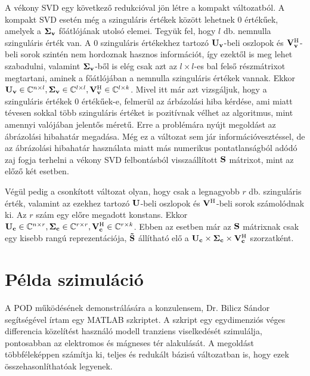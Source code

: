            A vékony SVD egy következő redukcióval jön létre a kompakt változatból. A kompakt SVD esetén még a szinguláris értékek között lehetnek 0 értékűek, amelyek a ${\bf \Sigma_v}$ főátlójának utolsó elemei. Tegyük fel, hogy $l$ db. nemnulla szinguláris érték van. A 0 szinguláris értékekhez tartozó ${\bf U_v}$-beli oszlopok és ${\bf V_v^{\mathrm{H}}}$-beli sorok szintén nem hordoznak hasznos információt, így ezektől is meg lehet szabadulni, valamint ${\bf \Sigma_v}$-ből is elég csak azt az $l\times l$-es bal felső részmátrixot megtartani, aminek a főátlójában a nemnulla szinguláris értékek vannak. Ekkor ${\bf U_v} \in \mathbb{C}^{n\times l}, {\bf \Sigma_v} \in \mathbb{C}^{l\times l}, {\bf V_v^{\mathrm{H}}} \in \mathbb{C}^{l\times k}$. Mivel itt már azt vizsgáljuk, hogy a szinguláris értékek 0 értékűek-e, felmerül az árbázolási hiba kérdése, ami miatt tévesen sokkal több szinguláris értéket is pozitívnak vélhet az algoritmus, mint amennyi valójában jelentős méretű. Erre a problémára nyújt megoldást az ábrázolási hibahatár megadása. Még ez a változat sem jár információvesztéssel, de az ábrázolási hibahatár használata miatt más numerikus pontatlanságból adódó zaj fogja terhelni a vékony SVD felbontásból visszaállított ${\bf S}$ mátrixot, mint az előző két esetben.
            \par
            Végül pedig a csonkított változat olyan, hogy csak a legnagyobb $r$ db. szinguláris érték, valamint az ezekhez tartozó ${\bf U}$-beli oszlopok és ${\bf V^{\mathrm{H}}}$-beli sorok számolódnak ki. Az $r$ szám egy előre megadott konstans. Ekkor ${\bf U_c} \in \mathbb{C}^{n\times r}, {\bf \Sigma_c} \in \mathbb{C}^{r\times r}, {\bf V_c^{\mathrm{H}}} \in \mathbb{C}^{r\times k}$. Ebben az esetben már az ${\bf S}$ mátrixnak csak egy kisebb rangú reprezentációja, ${\bf \tilde{S}}$ állítható elő a ${\bf U_c \times\Sigma_c\times V_c^{\mathrm{H}}}$ szorzatként.
    \section{Példa szimuláció}
        A POD működésének demonstrálására a konzulensem, Dr. Bilicz Sándor segítségével írtam egy MATLAB szkriptet. A szkript egy egydimenziós véges differencia közelítést használó modell tranziens viselkedését szimulálja, pontosabban az elektromos és mágneses tér alakulását. A megoldást többféleképpen számítja ki, teljes és redukált bázisú változatban is, hogy ezek összehasonlíthatóak legyenek.
